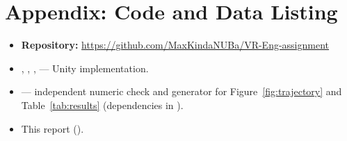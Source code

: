 \documentclass[11pt]{article}
\begin{document}
\appendix
\section*{Appendix: Code and Data Listing}
\begin{itemize}[nosep]
\raggedright
  \item \textbf{Repository:} \url{https://github.com/MaxKindaNUBa/VR-Eng-assignment}
  \item {}, ,
    ,  --- Unity implementation.
  \item {} --- independent numeric check and generator for
    Figure~\ref{fig:trajectory} and Table~\ref{tab:results} (dependencies in
    ).
  \item This report ().
\end{itemize}
\end{document}
